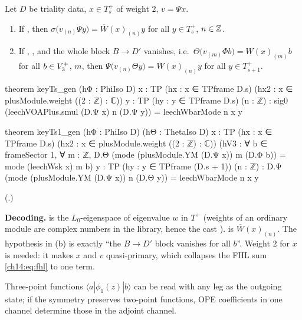 \begin{theorem}\label{ch14:thm:keyTs}
Let $D$ be triality data, $x\in T_s^+$ of weight $2$, $v=\Psi x$.
\begin{enumerate}[label=(\alph*)]
\item If , then $\sigma\bigl(v_{(n)}\Psi y\bigr)=\overline W(x)_{(n)}y$ for all
  $y\in T_s^+$, $n\in{\mathbb{Z}}$.
\item If , , and the whole block $B\to D'$ vanishes, i.e.\
  $\Theta\bigl(v_{(m)}\Phi b\bigr)=W(x)_{(m)}b$ for all $b\in V_3^{+}$, $m$, then
  $\Psi\bigl(v_{(n)}\Theta y\bigr)=\overline W(x)_{(n)}y$ for all $y\in T_{s+1}^+$.
\end{enumerate}
\end{theorem}
\begin{leancode}
theorem keyTs_gen (hΦ : PhiIso D) {x : TP} (hx : x ∈ TPframe D.s)
    (hx2 : x ∈ plusModule.weight ((2 : ℤ) : ℂ)) {y : TP} (hy : y ∈ TPframe D.s) (n : ℤ) :
    sig0 (leechVOAPlus.smul (D.Ψ x) n (D.Ψ y)) = leechWbarMode n x y

theorem keyTs1_gen (hΦ : PhiIso D) (hΘ : ThetaIso D) {x : TP} (hx : x ∈ TPframe D.s)
    (hx2 : x ∈ plusModule.weight ((2 : ℤ) : ℂ))
    (hV3 : ∀ b ∈ frameSector 1, ∀ m : ℤ,
      D.Θ (mode (plusModule.YM (D.Ψ x)) m (D.Φ b)) = mode (leechWsk x) m b)
    {y : TP} (hy : y ∈ TPframe (D.s + 1)) (n : ℤ) :
    D.Ψ (mode (plusModule.YM (D.Ψ x)) n (D.Θ y)) = leechWbarMode n x y
\end{leancode}
(.)

\begin{dictionary}
\textbf{Decoding.}   is the $L_0$-eigenspace of eigenvalue $w$ in $T^+$
(weights of an ordinary module are complex numbers in the library, hence the cast
\lean{((2 : ℤ) : ℂ)}).  \lean{leechWbarMode n x} is $\overline W(x)_{(n)}$.  The hypothesis 
in (b) is exactly ``the $B\to D'$ block vanishes for all $b$''.  Weight $2$ for $x$ is needed: it makes
$x$ and $v$ quasi-primary, which collapses the FHL sum \eqref{ch14:eq:fhl} to one term.
\end{dictionary}
\begin{physics}
Three-point functions $\langle a|\phi_1(z)|b\rangle$ can be read with any leg as the outgoing state; if the symmetry preserves two-point functions, OPE coefficients in one channel determine those in the adjoint channel.
\end{physics}


